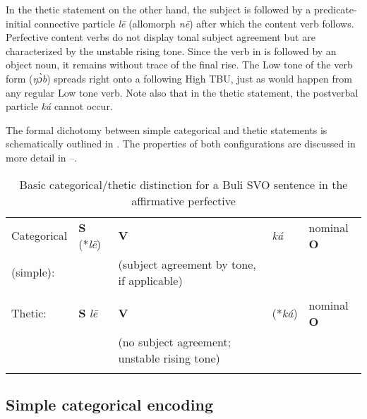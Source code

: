 \documentclass[output=paper]{langsci/langscibook}
\begin{document}
In the thetic statement on the other hand, the subject is followed by a predicate-initial connective particle \textit{l}\textit{\={e}} (allomorph \textit{n\={e}}) after which the content verb follows. Perfective content verbs do not display tonal subject agreement but are characterized by the unstable rising tone. Since the verb in  is followed by an object noun, it remains without trace of the final rise. The Low tone of the verb form (\textit{ŋ\`{ɔ}b}) spreads right onto a following High TBU, just as would happen from any regular Low tone verb. Note also that in the thetic statement, the postverbal particle \textit{ká} cannot occur.

  The formal dichotomy between simple categorical and thetic statements is schematically outlined in . The properties of both configurations are discussed in more detail in --.
 
\begin{table}
\caption{Basic categorical/thetic distinction for a Buli SVO sentence in the affirmative perfective}
\label{tab:Schwarz:2}

\begin{tabularx}{\textwidth}{XlXll}
\lsptoprule

{Categorical} & {\textbf{S}} {(*\textit{l\={e}})} & {\textbf{V} } & {\textit{ká}} & {nominal \textbf{O}}\\
{(simple):} & & {(subject agreement by tone, if applicable)} & { }\\
& & {}
\\
{Thetic:} & {\textbf{S}} {\textit{l\={e}}} & {\textbf{V} } & {(*\textit{ká})} & {nominal \textbf{O}}\\
& & {(no subject agreement; unstable rising tone)} \\

\lspbottomrule
\end{tabularx}

\end{table} 

\subsection{Simple categorical encoding}\label{sec:schwarz:3.2}
\end{document}
